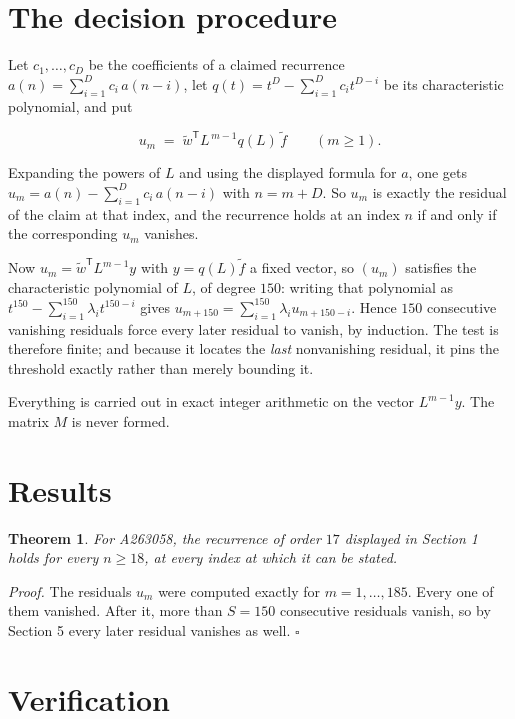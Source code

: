 \documentclass[11pt]{article}
\newtheorem{theorem}{Theorem}
\theoremstyle{definition}
\begin{document}
\section{The decision procedure}

Let $c_1,\dots,c_D$ be the coefficients of a claimed recurrence $a(n) = \sum_{i=1}^{D} c_i\,a(n-i)$, let $q(t) = t^{D} - \sum_{i=1}^{D} c_i t^{D-i}$ be its characteristic polynomial, and put

\[u_m \;=\; \tilde w^{\mathsf T} L^{\,m-1} q(L)\,\tilde f \qquad (m \ge 1).\]

Expanding the powers of $L$ and using the displayed formula for $a$, one gets $u_m = a(n) - \sum_{i=1}^{D} c_i\,a(n-i)$ with $n = m + D$. So $u_m$ is exactly the residual of the claim at that index, and the recurrence holds at an index $n$ if and only if the corresponding $u_m$ vanishes.

Now $u_m = \tilde w^{\mathsf T} L^{m-1} y$ with $y = q(L)\tilde f$ a fixed vector, so $(u_m)$ satisfies the characteristic polynomial of $L$, of degree $150$: writing that polynomial as $t^{150} - \sum_{i=1}^{150} \lambda_i t^{150-i}$ gives $u_{m+150} = \sum_{i=1}^{150} \lambda_i u_{m+150-i}$. Hence $150$ consecutive vanishing residuals force every later residual to vanish, by induction. The test is therefore finite; and because it locates the {\itshape last} nonvanishing residual, it pins the threshold exactly rather than merely bounding it.

Everything is carried out in exact integer arithmetic on the vector $L^{m-1}y$. The matrix $M$ is never formed.

\section{Results}

\begin{theorem} For A263058, the recurrence of order $17$ displayed in Section 1 holds for every $n \ge 18$, at every index at which it can be stated.\end{theorem}

{\itshape Proof.} The residuals $u_m$ were computed exactly for $m = 1,\dots,185$. Every one of them vanished. After it, more than $S = 150$ consecutive residuals vanish, so by Section 5 every later residual vanishes as well. $\square$

\section{Verification}
\end{document}
